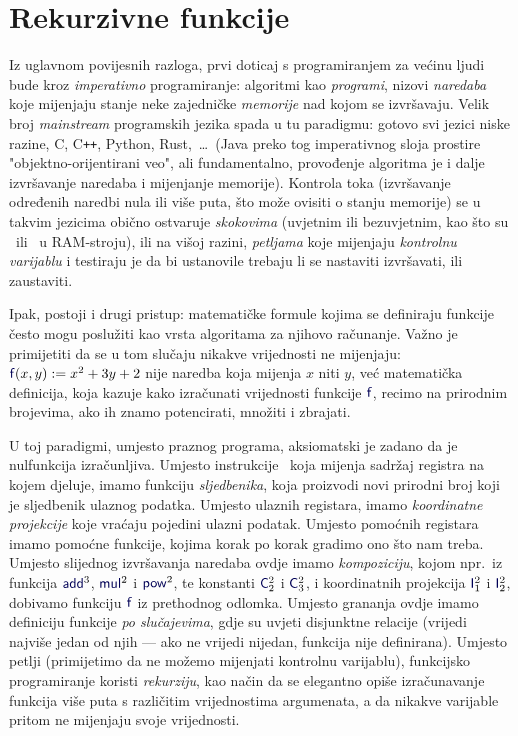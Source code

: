 \chapter{Rekurzivne funkcije}

Iz uglavnom povijesnih razloga, prvi doticaj s programiranjem za većinu ljudi bude kroz \emph{imperativno} programiranje: algoritmi kao \emph{programi}, nizovi \emph{naredaba} koje mijenjaju stanje neke zajedničke \emph{memorije} nad kojom se izvršavaju. Velik broj \emph{mainstream} programskih jezika spada u tu paradigmu: gotovo svi jezici niske razine, C, C\texttt{++}, Python, Rust,~\ldots\ (Java preko tog imperativnog sloja prostire "objektno-orijentirani veo", ali fundamentalno, provođenje algoritma je i dalje izvršavanje naredaba i mijenjanje memorije). Kontrola toka (izvršavanje određenih naredbi nula ili više puta, što može ovisiti o stanju memorije) se u takvim jezicima obično ostvaruje \emph{skokovima} (uvjetnim ili bezuvjetnim, kao što su \dec\ ili \goto\ u RAM-stroju), ili na višoj razini, \emph{petljama} koje mijenjaju \emph{kontrolnu varijablu} i testiraju je da bi ustanovile trebaju li se nastaviti izvršavati, ili zaustaviti.

Ipak, postoji i drugi pristup: matematičke formule kojima se definiraju funkcije često mogu poslužiti kao vrsta algoritama za njihovo računanje. Važno je primijetiti da se u tom slučaju nikakve vrijednosti ne mijenjaju: $\f f(x,y):=x^2+3y+2$ nije naredba koja mijenja $x$ niti $y$, već matematička definicija, koja kazuje kako izračunati vrijednosti funkcije $\f f$, recimo na prirodnim brojevima, ako ih znamo potencirati, množiti i zbrajati.

U toj paradigmi, umjesto praznog programa, aksiomatski je zadano da je nulfunkcija izračunljiva. Umjesto instrukcije \inc\ koja mijenja sadržaj registra na kojem djeluje, imamo funkciju \emph{sljedbenika}, koja proizvodi novi prirodni broj koji je sljedbenik ulaznog podatka. Umjesto ulaznih registara, imamo \emph{koordinatne projekcije} koje vraćaju pojedini ulazni podatak. Umjesto pomoćnih registara imamo pomoćne funkcije, kojima korak po korak gradimo ono što nam treba. Umjesto slijednog izvršavanja naredaba ovdje imamo \emph{kompoziciju}, kojom npr.\ iz funkcija $\f{add}^3$, $\f{mul}^2$ i $\f{pow}^2$, te konstanti $\f C_2^2$ i $\f C_3^2$, i koordinatnih projekcija $\f I_1^2$ i $\f I_2^2$, dobivamo funkciju $\f f$ iz prethodnog odlomka. Umjesto grananja ovdje imamo definiciju funkcije \emph{po slučajevima}, gdje su uvjeti disjunktne relacije (vrijedi najviše jedan od njih --- ako ne vrijedi nijedan, funkcija nije definirana). Umjesto petlji (primijetimo da ne možemo mijenjati kontrolnu varijablu), funkcijsko programiranje koristi \emph{rekurziju}, kao način da se elegantno opiše izračunavanje funkcija više puta s različitim vrijednostima argumenata, a da nikakve varijable pritom ne mijenjaju svoje vrijednosti. 

